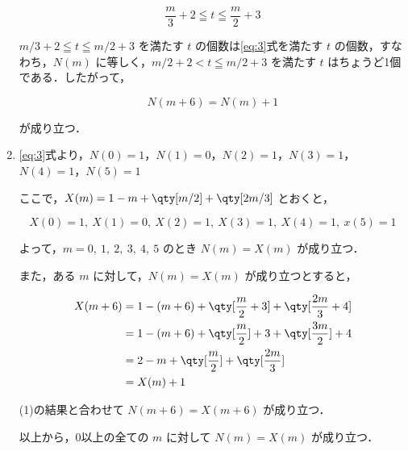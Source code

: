\documentclass[a4paper]{ltjsarticle}
\begin{document}
\begin{enumerate}[label=(\arabic*)]
          \begin{equation*}
              \frac{m}{3}+2\leqq t\leqq \frac{m}{2}+3
          \end{equation*}

          $m/3+2\leqq t\leqq m/2+3$ を満たす $t$ の個数は\eqref{eq:3}式を満たす $t$ の個数，すなわち，$N(m)$ に等しく，$m/2+2<t\leqq m/2+3$ を満たす $t$ はちょうど1個である．したがって，

          \begin{equation*}
              N(m+6)=N(m)+1
          \end{equation*}

          が成り立つ．

    \item \eqref{eq:3}式より，$N(0)=1$，$N(1)=0$，$N(2)=1$，$N(3)=1$，$N(4)=1$，$N(5)=1$

          ここで，$X(m)=1-m+\qty[m/2]+\qty[2m/3]$ とおくと，

          \begin{equation*}
              X(0)=1,\ X(1)=0,\ X(2)=1,\ X(3)=1,\ X(4)=1,\ x(5)=1
          \end{equation*}

          よって，$m=0,\ 1,\ 2,\ 3,\ 4,\ 5$ のとき $N(m)=X(m)$ が成り立つ．

          また，ある $m$ に対して，$N(m)=X(m)$ が成り立つとすると，

          \begin{align*}
              X(m+6) & =1-(m+6)+\qty[\frac{m}{2}+3]+\qty[\frac{2m}{3}+4] \\
                     & =1-(m+6)+\qty[\frac{m}{2}]+3+\qty[\frac{3m}{2}]+4 \\
                     & =2-m+\qty[\frac{m}{2}]+\qty[\frac{2m}{3}]         \\
                     & =X(m)+1
          \end{align*}

          (1)の結果と合わせて $N(m+6)=X(m+6)$ が成り立つ．

          以上から，0以上の全ての $m$ に対して $N(m)=X(m)$ が成り立つ．
\end{enumerate}

\end{document}
